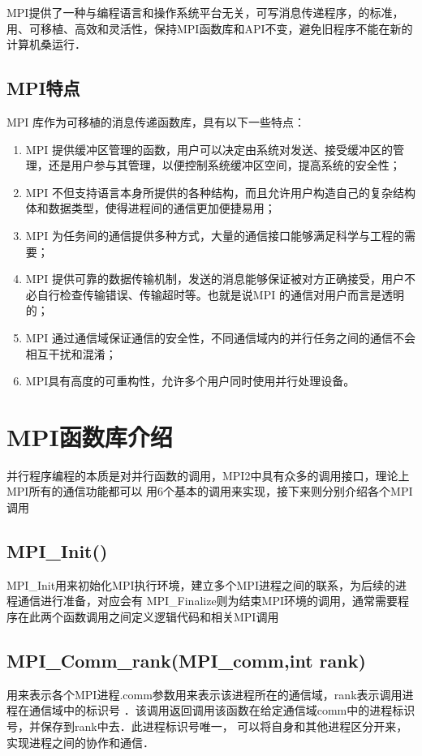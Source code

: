 MPI提供了一种与编程语言和操作系统平台无关，可写消息传递程序，的标准，
用、可移植、高效和灵活性，保持MPI函数库和API不变，避免旧程序不能在新的
计算机桑运行．

\subsection{MPI特点}
MPI 库作为可移植的消息传递函数库，具有以下一些特点：

\begin{enumerate}
\item MPI 提供缓冲区管理的函数，用户可以决定由系统对发送、接受缓冲区的管理，还是用户参与其管理，以便控制系统缓冲区空间，提高系统的安全性；
\item MPI 不但支持语言本身所提供的各种结构，而且允许用户构造自己的复杂结构体和数据类型，使得进程间的通信更加便捷易用；
\item MPI 为任务间的通信提供多种方式，大量的通信接口能够满足科学与工程的需要；
\item MPI 提供可靠的数据传输机制，发送的消息能够保证被对方正确接受，用户不必自行检查传输错误、传输超时等。也就是说MPI 的通信对用户而言是透明的；
\item MPI 通过通信域保证通信的安全性，不同通信域内的并行任务之间的通信不会相互干扰和混淆；
\item MPI具有高度的可重构性，允许多个用户同时使用并行处理设备。
\end{enumerate}

\section{MPI函数库介绍}
   并行程序编程的本质是对并行函数的调用，MPI2中具有众多的调用接口，理论上MPI所有的通信功能都可以
用6个基本的调用来实现，接下来则分别介绍各个MPI调用

\subsection{MPI\_Init()}
    MPI\_Init用来初始化MPI执行环境，建立多个MPI进程之间的联系，为后续的进程通信进行准备，对应会有
MPI\_Finalize则为结束MPI环境的调用，通常需要程序在此两个函数调用之间定义逻辑代码和相关MPI调用
\subsection{MPI\_Comm\_rank(MPI\_comm,int rank)}
    用来表示各个MPI进程.comm参数用来表示该进程所在的通信域，rank表示调用进程在通信域中的标识号
．该调用返回调用该函数在给定通信域comm中的进程标识号，并保存到rank中去．此进程标识号唯一，
可以将自身和其他进程区分开来，实现进程之间的协作和通信．
